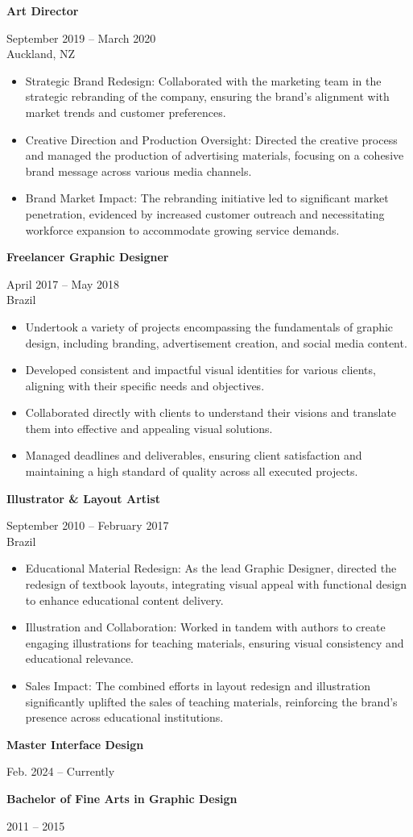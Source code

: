 \documentclass[10pt,a4paper,ragged2e,withhyper]{altacv}
\renewcommand{\cvevent}[4]{%
  \textbf{#1} %
  \hfill %
  \begin{minipage}[t]{.5\linewidth}
    \raggedleft %
    \small#3 %
    \\ %
    #4 %
  \end{minipage}
  \vspace{\baselineskip} %
}
\begin{document}
\divider



\cvevent{Art Director}{Clean.com}{September 2019 -- March 2020}{Auckland, NZ}
\begin{itemize}
  \item Strategic Brand Redesign: Collaborated with the marketing team in the strategic rebranding of the company, ensuring the brand's alignment with market trends and customer preferences.
  \item Creative Direction and Production Oversight: Directed the creative process and managed the production of advertising materials, focusing on a cohesive brand message across various media channels.
  \item Brand Market Impact: The rebranding initiative led to significant market penetration, evidenced by increased customer outreach and necessitating workforce expansion to accommodate growing service demands.
\end{itemize}

\divider

\cvevent{Freelancer Graphic Designer}{}{April 2017 -- May 2018}{Brazil}
\begin{itemize}
  \item Undertook a variety of projects encompassing the fundamentals of graphic design, including branding, advertisement creation, and social media content.
  \item Developed consistent and impactful visual identities for various clients, aligning with their specific needs and objectives.
  \item Collaborated directly with clients to understand their visions and translate them into effective and appealing visual solutions.
  \item Managed deadlines and deliverables, ensuring client satisfaction and maintaining a high standard of quality across all executed projects.
\end{itemize}

\divider

\cvevent{Illustrator \& Layout Artist}{Editora Teth}{September 2010 -- February 2017}{Brazil}
\begin{itemize}
  \item Educational Material Redesign: As the lead Graphic Designer, directed the redesign of textbook layouts, integrating visual appeal with functional design to enhance educational content delivery.
  \item Illustration and Collaboration: Worked in tandem with authors to create engaging illustrations for teaching materials, ensuring visual consistency and educational relevance.
  \item Sales Impact: The combined efforts in layout redesign and illustration significantly uplifted the sales of teaching materials, reinforcing the brand's presence across educational institutions.
\end{itemize}

\vspace{0.5cm}


\cvevent{Master Interface Design}{Aela}{Feb. 2024 -- Currently}{}

\divider

\cvevent{Bachelor of Fine Arts in Graphic Design}{Universidade Estácio de Sá}{2011 -- 2015}{}
\end{document}
